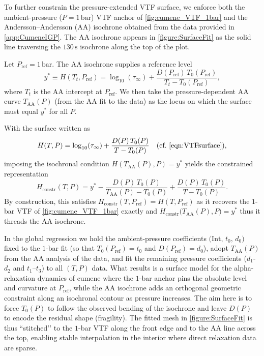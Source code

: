 To further constrain the pressure-extended VTF surface, we enforce both the ambient-pressure (\(P=1\,\text{bar}\)) VTF anchor of \fig \ref{fig:cumene_VTF_1bar} and the Andersson–Andersson (AA) isochrone obtained from the \tgp data provided in \app\ref{app:CumeneIGP}. The AA isochrone appears in \fig \ref{figure:SurfaceFit} as the solid line traversing the $130\,\si{\second}$ isochrone along the top of the plot. 

Let \(P_{\mathrm{ref}}=1\,\text{bar}\). The AA isochrone supplies a reference level
\begin{equation}
	y^\ast \equiv H(T_t,P_{\mathrm{ref}})
	= \log_{10}(\tau_\infty) + \frac{D(P_{\mathrm{ref}})\,T_0(P_{\mathrm{ref}})}{T_t - T_0(P_{\mathrm{ref}})},
	\label{eqn:H_definition}
\end{equation}
where \(T_t\) is the AA intercept at \(P_{\mathrm{ref}}\). We then take the pressure-dependent AA curve \(T_{\mathrm{AA}}(P)\) (from the AA fit to the \tgp data) as the locus on which the surface must equal \(y^\ast\) for all \(P\).

With the surface written as
\begin{equation}
	H(T,P)=\log_{10}(\tau_\infty)+\frac{D(P)\,T_0(P)}{T-T_0(P)}
	\quad\text{(cf.\ \eqref{eqn:VTFsurface})},
	\label{eqn:H_surface}
\end{equation}
imposing the isochronal condition \(H(T_{\mathrm{AA}}(P),P)=y^\ast\) yields the constrained representation
\begin{equation}
	\label{eqn:AAconstrained}
	H_{\mathrm{constr}}(T,P)=
	y^\ast-\frac{D(P)\,T_0(P)}{T_{\mathrm{AA}}(P)-T_0(P)}
	+\frac{D(P)\,T_0(P)}{T-T_0(P)}.
\end{equation}
By construction, this satisfies \(H_{\mathrm{constr}}(T,P_{\mathrm{ref}})=H(T,P_{\mathrm{ref}})\) as it recovers the \(1\)-bar VTF of \fig \ref{fig:cumene_VTF_1bar} exactly and \(H_{\mathrm{constr}}\!\big(T_{\mathrm{AA}}(P),P\big)=y^\ast\) thus it threads the AA isochrone.

In the global regression we hold the ambient-pressure coefficients \(\big(\mathrm{Int},\,t_0,\,d_0\big)\) fixed to the \(1\)-bar fit (so that \(T_0(P_{\mathrm{ref}})=t_0\) and \(D(P_{\mathrm{ref}})=d_0\)), adopt \(T_{\mathrm{AA}}(P)\) from the AA analysis of the \tgp data, and fit the remaining pressure coefficients (\eg \(d_1\)-\(d_2\) and \(t_1\)–\(t_3\)) to all \((T,P)\) data. What results is a surface model for the alpha-relaxation dynamics of cumene where the \(1\)-bar anchor pins the absolute level and curvature at \(P_{\mathrm{ref}}\), while the AA isochrone adds an orthogonal geometric constraint along an isochronal contour as pressure increases. The aim here is to force \(T_0(P)\) to follow the observed bending of the \tgp isochrone and leave \(D(P)\) to encode the residual shape (fragility). The fitted mesh in \fig \ref{figure:SurfaceFit} is thus “stitched’’ to the \(1\)-bar VTF along the front edge and to the AA line across the top, enabling stable interpolation in the interior where direct relaxation data are sparse.


